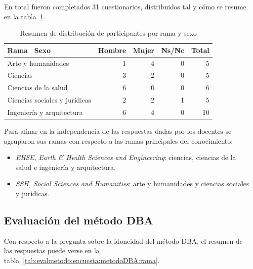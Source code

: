 En total fueron completados 31 cuestionarios, distribuidos tal y cómo se resume en la tabla~\ref{tab:evalmetodo:encuesta:rama:sexo}.

\begin{table}[H]
  \begin{center}
  \begin{tabular}{| l | r | r | r | r |}
    \hline
    Rama \ Sexo & Hombre & Mujer & Ns/Nc & Total \\
    \hline
    \hline
    Arte y humanidades & 1 & 4 & 0 & 5  \\
    \hline
    Ciencias & 3 & 2 & 0 & 5  \\
    \hline
    Ciencias de la salud & 6 & 0 & 0 & 6  \\
    \hline
    Ciencias sociales y jurídicas & 2 & 2 & 1 & 5  \\
    \hline
    Ingeniería y arquitectura & 6 & 4 & 0 & 10 \\
    \hline
  \end{tabular}
\end{center}
\caption{Resumen de distribución de participantes por rama y sexo}
\label{tab:evalmetodo:encuesta:rama:sexo}
\end{table}

Para afinar en la independencia de las respuestas dadas por los docentes se agruparon sus ramas con respecto a las ramas principales del conocimiento:

\begin{itemize}
\item \emph{EHSE, Earth \& Health Sciences and Engineering}: ciencias, ciencias de la salud e ingeniería y arquitectura.
\item \emph{SSH, Social Sciences and Humanities}: arte y humanidades y ciencias sociales y jurídicas.
\end{itemize}

\subsection{Evaluación del método DBA}

Con respecto a la pregunta sobre la idoneidad del método DBA, el resumen de las respuestas puede verse en la tabla~\ref{tab:evalmetodo:encuesta:metodoDBA:rama}.

